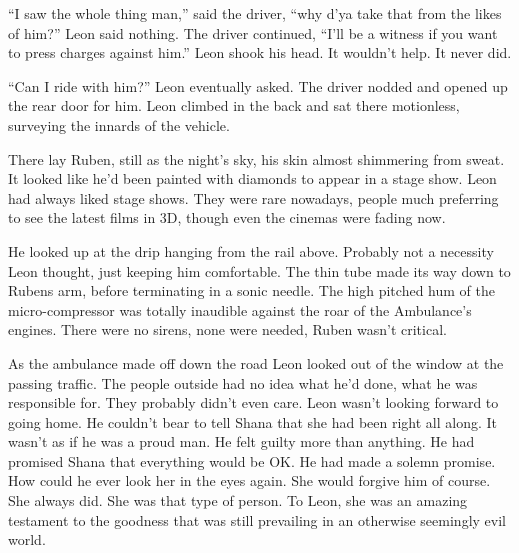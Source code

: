 ``I saw the whole thing man,'' said the driver, ``why d'ya take that from the likes of him?''  Leon said nothing.  The driver continued, ``I'll be a witness if you want to press charges against him.''  Leon shook his head.  It wouldn't help.  It never did.  

``Can I ride with him?'' Leon eventually asked.  The driver nodded and opened up the rear door for him.  Leon climbed in the back and sat there motionless, surveying the innards of the vehicle.

There lay Ruben, still as the night's sky, his skin almost shimmering from sweat.  It looked like he'd been painted with diamonds to appear in a stage show.  Leon had always liked stage shows.  They were rare nowadays, people much preferring to see the latest films in 3D, though even the cinemas were fading now.  

He looked up at the drip hanging from the rail above.  Probably not a necessity Leon thought, just keeping him comfortable.  The thin tube made its way down to Rubens arm, before terminating in a sonic needle.  The high pitched hum of the micro-compressor was totally inaudible against the roar of the Ambulance's engines.  There were no sirens, none were needed, Ruben wasn't critical.

As the ambulance made off down the road Leon looked out of the window at the passing traffic.  The people outside had no idea what he'd done, what he was responsible for.  They probably didn't even care.  Leon wasn't looking forward to going home.  He couldn't bear to tell Shana that she had been right all along.  It wasn't as if he was a proud man.  He felt guilty more than anything.  He had promised Shana that everything would be OK.  He had made a solemn promise.  How could he ever look her in the eyes again.  She would forgive him of course.  She always did.  She was that type of person.  To Leon, she was an amazing testament to the goodness that was still prevailing in an otherwise seemingly evil world.   






